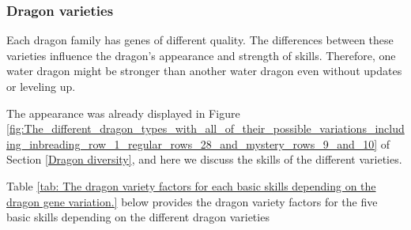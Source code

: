 \documentclass[12pt]{article}
\begin{document}
\vspace{\baselineskip}
\subsubsection{Dragon varieties}\label{Dragon varieties}   \par

Each dragon family has genes of different quality. The differences between these varieties influence the dragon’s appearance and strength of skills. Therefore, one water dragon might be stronger than another water dragon even without updates or leveling up.\par

The appearance was already displayed in Figure  \ref{fig:The_different_dragon_types_with_all_of_their_possible_variations_including_inbreading_row_1_regular_rows_28_and_mystery_rows_9_and_10} of Section \ref{Dragon diversity}, and here we discuss the skills of the different varieties.\par

 Table \ref{tab: The dragon variety factors for each basic skills depending on the dragon gene variation.} below provides the dragon variety factors for the five basic skills depending on the different dragon varieties \par



\end{document}
